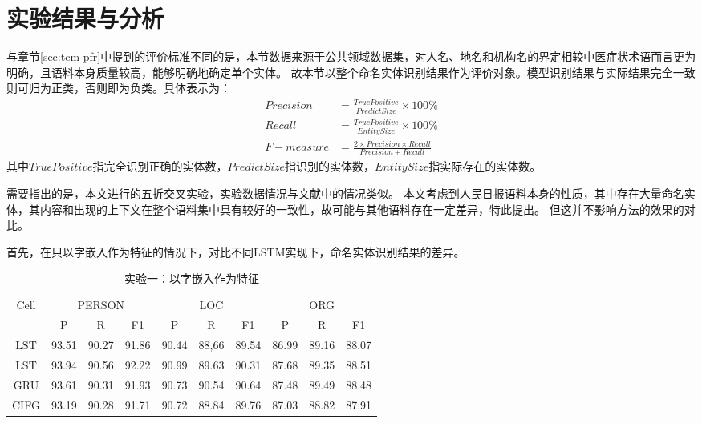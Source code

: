 \section{实验结果与分析}
与章节\ref{sec:tcm-pfr}中提到的评价标准不同的是，本节数据来源于公共领域数据集，对人名、地名和机构名的界定相较中医症状术语而言更为明确，且语料本身质量较高，能够明确地确定单个实体。
故本节以整个命名实体识别结果作为评价对象。模型识别结果与实际结果完全一致则可归为正类，否则即为负类。具体表示为：
\begin{align}
    Precision &= \frac{True Positive}{Predict Size} \times 100\% \\
    Recall &= \frac{True Positive}{Entity Size} \times 100\% \\
    F-measure &= \frac{2\times Precision \times Recall}{Precision + Recall}
\end{align}
其中$True Positive$指完全识别正确的实体数，$Predict Size$指识别的实体数，$Entity Size$指实际存在的实体数。

需要指出的是，本文进行的五折交叉实验，实验数据情况与文献中的情况类似。
本文考虑到人民日报语料本身的性质，其中存在大量命名实体，其内容和出现的上下文在整个语料集中具有较好的一致性，故可能与其他语料存在一定差异，特此提出。
但这并不影响方法的效果的对比。

首先，在只以字嵌入作为特征的情况下，对比不同LSTM实现下，命名实体识别结果的差异。
\begin{table}[H]
    \centering
    \caption{实验一：以字嵌入作为特征}
    \begin{tabular}{cccccccccc}
        \toprule
            \multirow{2}{*}{Cell} &\multicolumn{3}{c}{PERSON} &\multicolumn{3}{c}{LOC} &\multicolumn{3}{c}{ORG}\\
            \cmidrule(lr){2-4} \cmidrule(lr){5-7} \cmidrule(lr){8-10}
            & P & R & F1 & P & R & F1 & P & R & F1\\
        \midrule
        $\mathop{LSTM_{baseline}}$ & 93.51 & 90.27 & 91.86 & 90.44 & 88,66 & 89.54 & 86.99 & 89.16 & 88.07\\
        $\mathop{LSTM_{peep-hole}}$ & 93.94 & 90.56 & 92.22 & 90.99 & 89.63 & 90.31 & 87.68 & 89.35 & 88.51\\
        GRU & 93.61 & 90.31 & 91.93 & 90.73 & 90.54 & 90.64 & 87.48 & 89.49 & 88.48\\
        CIFG  & 93.19 & 90.28 & 91.71 & 90.72 & 88.84 & 89.76 & 87.03 & 88.82 & 87.91\\
        \bottomrule
    \end{tabular}
    \label{tab:lstm_cell_comparison}
\end{table}

